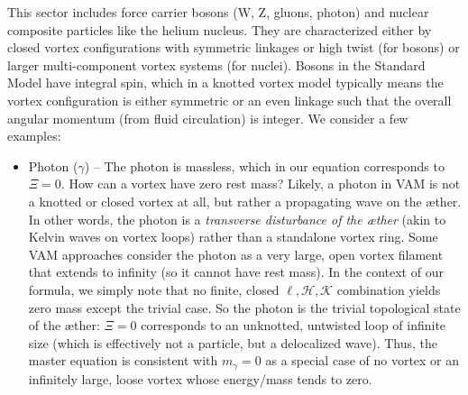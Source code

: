 This sector includes force carrier bosons (W, Z, gluons, photon) and nuclear composite particles like the helium nucleus. They are characterized either by closed vortex configurations with symmetric linkages or high twist (for bosons) or larger multi-component vortex systems (for nuclei). Bosons in the Standard Model have integral spin, which in a knotted vortex model typically means the vortex configuration is either symmetric or an even linkage such that the overall angular momentum (from fluid circulation) is integer. We consider a few examples:\begin{itemize}

\item
Photon ($\gamma$) – The photon is massless, which in our equation corresponds to $\Xi=0$. How can a vortex have zero rest mass? Likely, a photon in VAM is not a knotted or closed vortex at all, but rather a propagating wave on the æther. In other words, the photon is a \textit{transverse disturbance of the æther} (akin to Kelvin waves on vortex loops) rather than a standalone vortex ring. Some VAM approaches consider the photon as a very large, open vortex filament that extends to infinity (so it cannot have rest mass). In the context of our formula, we simply note that no finite, closed $\ell,\mathcal{H},\mathcal{K}$ combination yields zero mass except the trivial case. So the photon is the trivial topological state of the æther: $\Xi=0$ corresponds to an unknotted, untwisted loop of infinite size (which is effectively not a particle, but a delocalized wave). Thus, the master equation is consistent with $m_\gamma=0$ as a special case of no vortex or an infinitely large, loose vortex whose energy/mass tends to zero.


\end{itemize}

